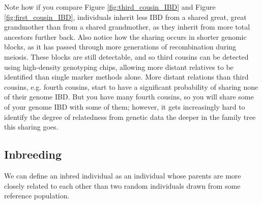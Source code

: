 {{Note how if you compare Figure \ref{fig:third_cousin_IBD} and Figure \ref{fig:first_cousin_IBD}, individuals inherit less IBD from a shared great, great grandmother than from a shared grandmother, as they inherit from more total ancestors further back. Also notice how the sharing occurs in shorter genomic blocks, as it has passed through more generations of recombination during meiosis. These blocks are still detectable, and so third cousins can be detected using high-density genotyping chips, allowing more distant relatives to be identified than single marker methods alone.  More distant relations than third cousins, e.g. fourth cousins, start to have a significant probability of sharing none of their genome IBD. But you have many fourth cousins, so you will share some of your genome IBD with some of them; however, it gets increasingly hard to identify the degree of relatedness from genetic data the deeper in the family tree this sharing goes.

\subsection{Inbreeding}
We can define an inbred individual as an individual whose parents are
more closely related to each other than two random individuals drawn
from some reference population.  \\


}}

